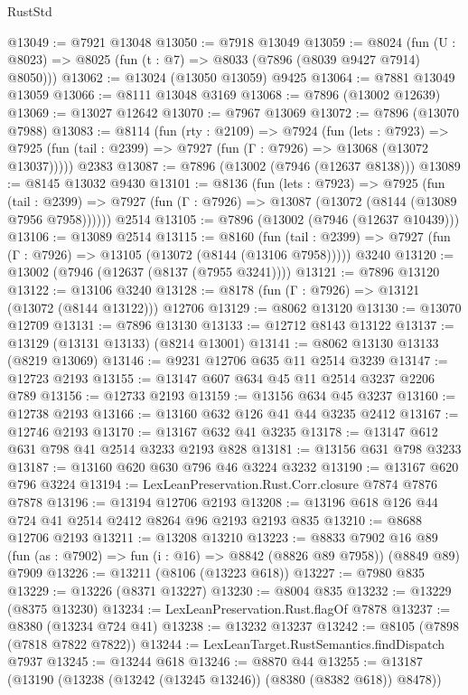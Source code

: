 \begin{lexlean}{RustStd}
\begin{coremodule}
{\begin{coremodule}
{{{{{{{{{{{{{{{{{{{{{{{{{{{{{{{{{{{{{{{{{{{{{{{{{{@13049 := @7921 @13048
@13050 := @7918 @13049
@13059 := @8024 (fun (U : @8023) => @8025 (fun (t : @7) => @8033 (@7896 (@8039 @9427 @7914) @8050)))
@13062 := @13024 (@13050 @13059) @9425
@13064 := @7881 @13049 @13059
@13066 := @8111 @13048 @3169
@13068 := @7896 (@13002 @12639)
@13069 := @13027 @12642
@13070 := @7967 @13069
@13072 := @7896 (@13070 @7988)
@13083 := @8114
    (fun (rty : @2109) =>
    @7924
      (fun (lets : @7923) =>
      @7925 (fun (tail : @2399) => @7927 (fun (Γ : @7926) => @13068 (@13072 @13037)))))
    @2383
@13087 := @7896 (@13002 (@7946 (@12637 @8138)))
@13089 := @8145 @13032 @9430
@13101 := @8136
    (fun (lets : @7923) =>
    @7925
      (fun (tail : @2399) =>
      @7927 (fun (Γ : @7926) => @13087 (@13072 (@8144 (@13089 @7956 @7958))))))
    @2514
@13105 := @7896 (@13002 (@7946 (@12637 @10439)))
@13106 := @13089 @2514
@13115 := @8160
    (fun (tail : @2399) => @7927 (fun (Γ : @7926) => @13105 (@13072 (@8144 (@13106 @7958)))))
    @3240
@13120 := @13002 (@7946 (@12637 (@8137 (@7955 @3241))))
@13121 := @7896 @13120
@13122 := @13106 @3240
@13128 := @8178 (fun (Γ : @7926) => @13121 (@13072 (@8144 @13122))) @12706
@13129 := @8062 @13120
@13130 := @13070 @12709
@13131 := @7896 @13130
@13133 := @12712 @8143 @13122
@13137 := @13129 (@13131 @13133) (@8214 @13001)
@13141 := @8062 @13130 @13133 (@8219 @13069)
@13146 := @9231 @12706 @635 @11 @2514 @3239
@13147 := @12723 @2193
@13155 := @13147 @607 @634 @45 @11 @2514 @3237 @2206 @789
@13156 := @12733 @2193
@13159 := @13156 @634 @45 @3237
@13160 := @12738 @2193
@13166 := @13160 @632 @126 @41 @44 @3235 @2412
@13167 := @12746 @2193
@13170 := @13167 @632 @41 @3235
@13178 := @13147 @612 @631 @798 @41 @2514 @3233 @2193 @828
@13181 := @13156 @631 @798 @3233
@13187 := @13160 @620 @630 @796 @46 @3224 @3232
@13190 := @13167 @620 @796 @3224
@13194 := LexLeanPreservation.Rust.Corr.closure @7874 @7876 @7878
@13196 := @13194 @12706 @2193
@13208 := @13196 @618 @126 @44 @724 @41 @2514 @2412 @8264 @96 @2193 @2193 @835
@13210 := @8688 @12706 @2193
@13211 := @13208 @13210
@13223 := @8833
    @7902
    @16
    @89
    (fun (as : @7902) => fun (i : @16) => @8842 (@8826 @89 @7958))
    (@8849 @89)
    @7909
@13226 := @13211 (@8106 (@13223 @618))
@13227 := @7980 @835
@13229 := @13226 (@8371 @13227)
@13230 := @8004 @835
@13232 := @13229 (@8375 @13230)
@13234 := LexLeanPreservation.Rust.flagOf @7878
@13237 := @8380 (@13234 @724 @41)
@13238 := @13232 @13237
@13242 := @8105 (@7898 (@7818 @7822 @7822))
@13244 := LexLeanTarget.RustSemantics.findDispatch @7937
@13245 := @13244 @618
@13246 := @8870 @44
@13255 := @13187 (@13190 (@13238 (@13242 (@13245 @13246)) (@8380 (@8382 @618)) @8478))
}}}}}}}}}}}}}}}}}}}}}}}}}}}}}}}}}}}}}}}}}}}}}}}}}}
\end{coremodule}}
\end{coremodule}
\end{lexlean}
